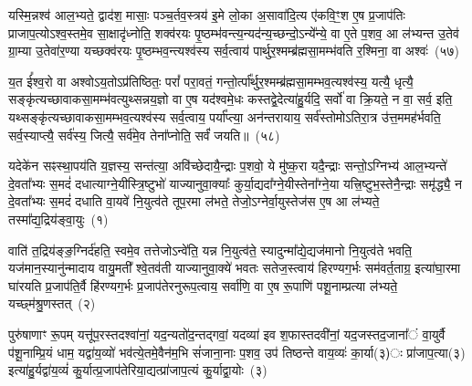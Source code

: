 यस्मि॒न्नश्व॑ आल॒भ्यते॒ द्वाद॑श॒ मासाः॒ पञ्च॒र्तव॒स्त्रय॑ इ॒मे लो॒का अ॒सावा॑दि॒त्य ए॑कवि॒ꣳ॒श ए॒ष प्र॒जाप॑तिः प्राजाप॒त्यो\-ऽश्व॒स्तमे॒व सा॒क्षादृ॑ध्नोति॒ शक्व॑रयः पृ॒ष्ठम्भ॑वन्त्य॒न्यद॑न्य॒च्छन्दो॒\-ऽन्ये᳚न्ये॒ वा ए॒ते प॒शव॒ आ ल॑भ्यन्त उ॒तेव॑ ग्रा॒म्या उ॒तेवा॑र॒ण्या यच्छक्व॑रयः पृ॒ष्ठम्भव॒न्त्यश्व॑स्य सर्व॒त्वाय॑ पार्थुर॒श्मम्ब्र॑ह्मसा॒मम्भ॑वति र॒श्मिना॒ वा अश्वः॑~(५७)

य॒त ई᳚श्व॒रो वा अश्वो\-ऽय॒तो\-ऽप्र॑तिष्ठितः॒ परां᳚ परा॒वतं॒ गन्तो॒र्त्पा᳚र्थुर॒श्मम्ब्र॑ह्मसा॒मम्भव॒त्यश्व॑स्य॒ यत्यै॒ धृत्यै॒ सङ्कृ॑त्यच्छावाकसा॒मम्भ॑वत्युथ्सन्नय॒ज्ञो वा ए॒ष यद॑श्वमे॒धः कस्तद्वे॒देत्या॑हु॒र्यदि॒ सर्वो॑ वा क्रि॒यते॒ न वा॒ सर्व॒ इति॒ यथ्सङ्कृ॑त्यच्छावाकसा॒मम्भव॒त्यश्व॑स्य सर्व॒त्वाय॒ पर्या᳚प्त्या॒ अन॑न्तरायाय॒ सर्व॑स्तोमो\-ऽतिरा॒त्र उ॑त्त॒ममह॑र्भवति॒ सर्व॒स्याप्त्यै॒ सर्व॑स्य॒ जित्यै॒ सर्व॑मे॒व तेना᳚प्नोति॒ सर्वं॑ जयति॥~(५८)

{}%


{}%

\setcounter{anuvakam}{0}
यदेके॑न सꣴस्था॒पय॑ति य॒ज्ञस्य॒ सन्त॑त्या॒ अवि॑च्छेदायै॒न्द्राः प॒शवो॒ ये मु॑ष्क॒रा यदै॒न्द्राः सन्तो॒\-ऽग्निभ्य॑ आल॒भ्यन्ते॑ दे॒वता᳚भ्यः स॒मदं॑ दधात्याग्ने॒यीस्त्रि॒ष्टुभो॑ याज्यानुवा॒क्याः᳚ कुर्या॒द्यदा᳚ग्ने॒यीस्तेना᳚ग्ने॒या यत्त्रि॒ष्टुभ॒स्तेनै॒न्द्राः समृ॑द्ध्यै॒ न दे॒वता᳚भ्यः स॒मदं॑ दधाति वा॒यवे॑ नि॒युत्व॑ते तूप॒रमा ल॑भते॒ तेजो॒\-ऽग्नेर्वा॒युस्तेज॑स ए॒ष आ ल॑भ्यते॒ तस्मा᳚द्य॒द्रिय॑ङ्वा॒युः~(१)

वाति॑ त॒द्रिय॑ङ्ङ॒ग्निर्द॑हति॒ स्वमे॒व तत्तेजो\-ऽन्वे॑ति॒ यन्न नि॒युत्व॑ते॒ स्यादुन्मा᳚द्ये॒द्यज॑मानो नि॒युत्व॑ते भवति॒ यज॑मान॒स्यानु॑न्मादाय वायु॒मती᳚ श्वे॒तव॑ती याज्यानुवा॒क्ये॑ भवतः सतेज॒स्त्वाय॑ हिरण्यग॒र्भः सम॑वर्त॒ताग्र॒ इत्या॑घा॒रमा घा॑रयति प्र॒जाप॑ति॒र्वै हि॑रण्यग॒र्भः प्र॒जाप॑तेरनुरूप॒त्वाय॒ सर्वा॑णि॒ वा ए॒ष रू॒पाणि॑ पशू॒नाम्प्रत्या ल॑भ्यते॒ यच्छ्म॑श्रु॒णस्तत्~(२)

पुरु॑षाणाꣳ रू॒पम् यत्तू॑प॒रस्तदश्वा॑नां॒ यद॒न्यतो॑द॒न्तद्गवां॒ यदव्या॑ इव श॒फास्तदवी॑नां॒ यद॒जस्तद॒जाना᳚ं वा॒युर्वै प॑शू॒नाम्प्रि॒यं धाम॒ यद्वा॑य॒व्यो॑ भव॑त्ये॒तमे॒वैन॑म॒भि सं॑जाना॒नाः प॒शव॒ उप॑ तिष्ठन्ते वाय॒व्यः॑ का॒र्या(३)ः प्रा॑जाप॒त्या(३) इत्या॑हु॒र्यद्वा॑य॒व्यं॑ कु॒र्यात्प्र॒जाप॑तेरिया॒द्यत्प्रा॑जाप॒त्यं कु॒र्याद्वा॒योः~(३)

